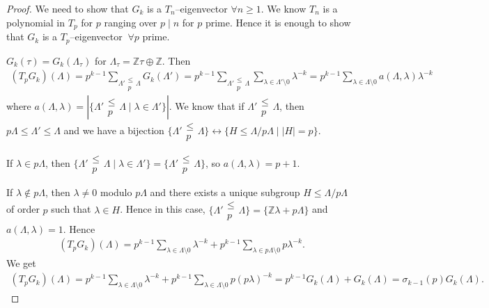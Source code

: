 \documentclass{article}
\theoremstyle{definition}
\begin{document}
\begin{proof}
    We need to show that $G_k$ is a $T_n$--eigenvector $\forall n\ge 1$. We know $T_n$ is a polynomial in $T_p$ for $p$ ranging over $p \mid n$ for $p$ prime. Hence it is enough to show that $G_k$ is a $T_p$--eigenvector $~\forall p$ prime.
    \vspace{1mm}
     
    $G_k(\tau) = G_k(\Lambda_{\tau})$ for $\Lambda_\tau = \mathbb{Z} \tau \oplus \mathbb{Z}$. Then 
    \begin{align*}
        (T_p G_k)(\Lambda) = p^{k-1}\sum_{\Lambda' \substack{\le  \\ p} \Lambda} G_k(\Lambda') = p^{k-1} \sum_{\Lambda' \substack{\le  \\ p} \Lambda} \sum_{\lambda \in \Lambda' \setminus 0}^{} \lambda^{-k} = p^{k-1}\sum_{\lambda \in \Lambda\setminus 0}^{} a(\Lambda,\lambda)\lambda^{-k}
    \end{align*}
    where $a(\Lambda,\lambda) = |\{\Lambda' \substack{\le \\ p}\Lambda \mid  \lambda \in \Lambda'\}|$. We know that if $\Lambda' \substack{\le  \\p} \Lambda$, then $p \Lambda \le  \Lambda' \le \Lambda$ and we have a bijection $\{\Lambda' \substack{\le  \\ p} \Lambda\} \leftrightarrow \{H \le \Lambda/p \Lambda \mid |H| = p\}$.
    \vspace{1mm}
     
    If $\lambda \in p \Lambda$, then $\{\Lambda' \substack{\le \\ p} \Lambda \mid \lambda \in \Lambda'\} = \{\Lambda' \substack{\le  \\ p}\Lambda\}$, so $a(\Lambda,\lambda) = p + 1$.
    \vspace{1mm}
     
    If $\lambda \not\in p \Lambda$, then $\lambda \neq 0$ modulo $p \Lambda$ and there exists a unique subgroup $H \le \Lambda/p \Lambda$ of order $p$ such that $\lambda \in H$. Hence in this case, $\{\Lambda' \substack{\le  \\p}\Lambda\} = \{\mathbb{Z} \lambda + p \Lambda\}$ and $a(\Lambda,\lambda) = 1$. Hence
    \begin{align*}
        (T_p G_k)(\Lambda) = p^{k-1}\sum_{\lambda \in \Lambda\setminus 0} \lambda^{-k} + p^{k-1} \sum_{\lambda \in p \Lambda \setminus 0}^{} p \lambda^{-k}.
    \end{align*}
    We get 
    \begin{align*}
        (T_p G_k)(\Lambda) = p^{k-1}\sum_{\lambda \in \Lambda \setminus 0}^{} \lambda^{-k} + p^{k-1}\sum_{\lambda \in \Lambda\setminus 0}^{} p(p \lambda)^{-k} = p^{k-1}G_k(\Lambda) + G_k(\Lambda) = \sigma_{k-1}(p)G_k(\Lambda).
    \end{align*} 
\end{proof}
\end{document}
